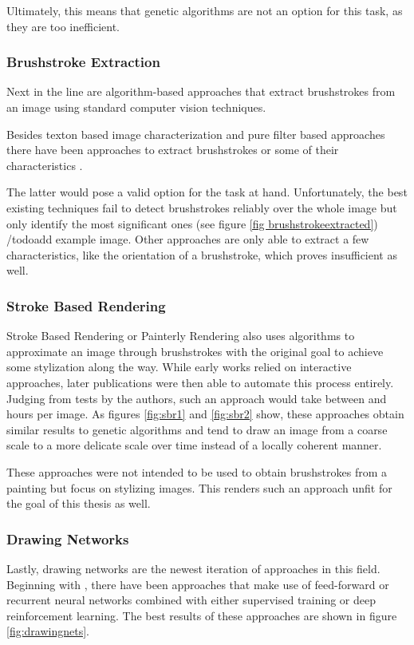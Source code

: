 Ultimately, this means that genetic algorithms are not an option for this task, as they are too inefficient.

\subsubsection{Brushstroke Extraction}
Next in the line are algorithm-based approaches that extract brushstrokes from an image using standard computer vision techniques.

Besides texton based image characterization \cite{textons} and pure filter based approaches \cite{filters} there have been approaches to extract brushstrokes or some of their characteristics \cite{brushstrokecharacteristics} \cite{brushstrokeextraction}.

The latter would pose a valid option for the task at hand.
Unfortunately, the best existing techniques fail to detect brushstrokes reliably over the whole image but only identify the most significant ones (see figure \ref{fig brushstrokeextracted}) /todo{add example image}.
Other approaches are only able to extract a few characteristics, like the orientation of a brushstroke, which proves insufficient as well.

\subsubsection{Stroke Based Rendering}
Stroke Based Rendering or Painterly Rendering also uses algorithms to approximate an image through brushstrokes with the original goal to achieve some stylization along the way.
While early works relied on interactive approaches, later publications were then able to automate this process entirely.
Judging from tests by the authors, such an approach would take between  and  hours per image.
As figures \ref{fig:sbr1} and \ref{fig:sbr2} show, these approaches obtain similar results to genetic algorithms and tend to draw an image from a coarse scale to a more delicate scale over time instead of a locally coherent manner.

These approaches were not intended to be used to obtain brushstrokes from a painting but focus on stylizing images.
This renders such an approach unfit for the goal of this thesis as well.

\subsubsection{Drawing Networks}
Lastly, drawing networks are the newest iteration of approaches in this field.
Beginning with , there have been approaches that make use of feed-forward or recurrent neural networks combined with either supervised training or deep reinforcement learning.
The best results of these approaches are shown in figure \ref{fig:drawingnets}.

